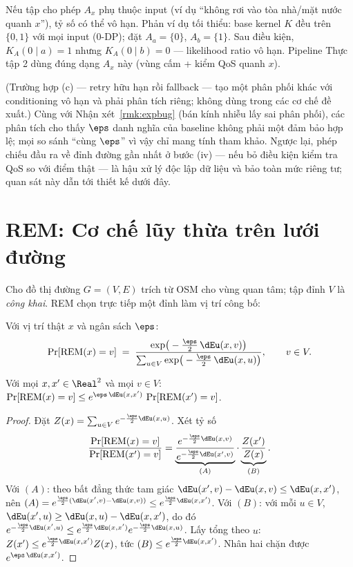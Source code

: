 \begin{menhde}
\label{prop:reject}
Nếu tập cho phép $A_x$ phụ thuộc input (ví dụ ``không rơi vào tòa nhà/mặt nước
quanh $x$''), tỷ số có thể vô hạn. Phản ví dụ tối thiểu: base kernel $K$ đều trên
$\{0,1\}$ với mọi input (0-DP); đặt $A_a=\{0\}$, $A_b=\{1\}$. Sau điều kiện,
$K_A(0\mid a)=1$ nhưng $K_A(0\mid b)=0$ --- likelihood ratio vô hạn. Pipeline
Thực tập 2 dùng đúng dạng $A_x$ này (vùng cấm + kiểm QoS quanh $x$).
\end{menhde}

\noindent (Trường hợp (c) --- retry hữu hạn rồi fallback --- tạo một phân phối
khác với conditioning vô hạn và phải phân tích riêng; không dùng trong các cơ chế
đề xuất.) Cùng với Nhận xét~\ref{rmk:expbug} (bán kính nhiễu lấy sai phân phối),
các phân tích cho thấy $\eps$ danh nghĩa của baseline không phải một đảm bảo hợp
lệ; mọi so sánh ``cùng $\eps$'' vì vậy chỉ mang tính tham khảo.
Ngược lại, phép chiếu đầu ra về đỉnh đường gần nhất ở bước (iv) --- nếu bỏ điều
kiện kiểm tra QoS so với điểm thật --- là hậu xử lý độc lập dữ liệu và bảo toàn
mức riêng tư; quan sát này dẫn tới thiết kế dưới đây.

\section{REM: Cơ chế lũy thừa trên lưới đường}
\label{sec:rem}

Cho đồ thị đường $G = (V, E)$ trích từ OSM cho vùng quan tâm; tập đỉnh $V$ là
\emph{công khai}. REM chọn trực tiếp một đỉnh làm vị trí công bố:

\begin{dinhnghia}[REM]
\label{def:rem}
Với vị trí thật $x$ và ngân sách $\eps$:
\[
\Pr[\mathrm{REM}(x) = v] \;=\; \frac{\exp\!\big(-\tfrac{\eps}{2}\,\dEu(x, v)\big)}
{\sum_{u \in V} \exp\!\big(-\tfrac{\eps}{2}\,\dEu(x, u)\big)},
\qquad v \in V.
\]
\end{dinhnghia}

\begin{dinhly}
\label{thm:rem}
Với mọi $x, x' \in \Real^2$ và mọi $v \in V$:
$\Pr[\mathrm{REM}(x) = v] \le e^{\eps\,\dEu(x,x')}\,\Pr[\mathrm{REM}(x') = v]$.
\end{dinhly}

\begin{proof}
Đặt $Z(x) = \sum_{u \in V} e^{-\frac{\eps}{2} \dEu(x,u)}$. Xét tỷ số
\[
\frac{\Pr[\mathrm{REM}(x) = v]}{\Pr[\mathrm{REM}(x') = v]}
= \underbrace{\frac{e^{-\frac{\eps}{2}\dEu(x,v)}}{e^{-\frac{\eps}{2}\dEu(x',v)}}}_{(A)}
\cdot \underbrace{\frac{Z(x')}{Z(x)}}_{(B)}.
\]
Với $(A)$: theo bất đẳng thức tam giác
$\dEu(x',v) - \dEu(x,v) \le \dEu(x,x')$, nên
$(A) = e^{\frac{\eps}{2}(\dEu(x',v) - \dEu(x,v))} \le e^{\frac{\eps}{2}\dEu(x,x')}$.
Với $(B)$: với mỗi $u \in V$,
$\dEu(x', u) \ge \dEu(x, u) - \dEu(x, x')$, do đó
$e^{-\frac{\eps}{2}\dEu(x',u)} \le e^{\frac{\eps}{2}\dEu(x,x')}
e^{-\frac{\eps}{2}\dEu(x,u)}$. Lấy tổng theo $u$:
$Z(x') \le e^{\frac{\eps}{2}\dEu(x,x')} Z(x)$, tức
$(B) \le e^{\frac{\eps}{2}\dEu(x,x')}$. Nhân hai chặn được
$e^{\eps\,\dEu(x,x')}$.
\end{proof}

